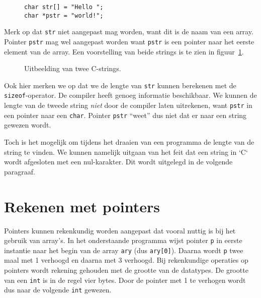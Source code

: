 \begin{figure}[!ht]
\begin{lstlisting}[caption=Declaratie en initialisatie van twee C-strings.,label=cod:poistrings]
char str[] = "Hello ";
char *pstr = "world!";
\end{lstlisting}
\end{figure}

Merk op dat \texttt{str} niet aangepast mag worden, want dit is de naam van een array. Pointer \texttt{pstr} mag wel aangepast worden want \texttt{pstr} is een pointer naar het eerste element van de array. Een voorstelling van beide strings is te zien in figuur~\ref{fig:poistrings}.

\begin{figure}[!ht]
\centering
{}
\caption{Uitbeelding van twee C-strings.}
\label{fig:poistrings}
\end{figure}

Ook hier merken we op dat we de lengte van \texttt{str} kunnen berekenen met de \texttt{sizeof}-operator. De compiler heeft genoeg informatie beschikbaar. We kunnen de lengte van de tweede string \textsl{niet} door de compiler laten uitrekenen, want \texttt{pstr} in een pointer naar een \texttt{char}. Pointer \texttt{pstr} ``weet'' dus niet dat er naar een string gewezen wordt.

Toch is het mogelijk om tijdens het draaien van een programma de lengte van de string te vinden. We kunnen namelijk uitgaan van het feit dat een string in `C` wordt afgesloten met een nul-karakter. Dit wordt uitgelegd in de volgende paragraaf.


\section{Rekenen met pointers}
\label{sec:rekenenmetpointers}
Pointers kunnen rekenkundig worden aangepast dat vooral nuttig is bij het gebruik van array's.
In het onderstaande programma wijst pointer \texttt{p} in eerste instantie naar het begin van de array \texttt{ary} (dus \texttt{ary[0]}). Daarna wordt \texttt{p} twee maal met 1 verhoogd en daarna met 3 verhoogd. Bij rekenkundige operaties op pointers wordt rekening gehouden met de grootte van de datatypes. De grootte van een \texttt{int} is in de regel vier bytes. Door de pointer met 1 te verhogen wordt dus naar de volgende \texttt{int} gewezen.

